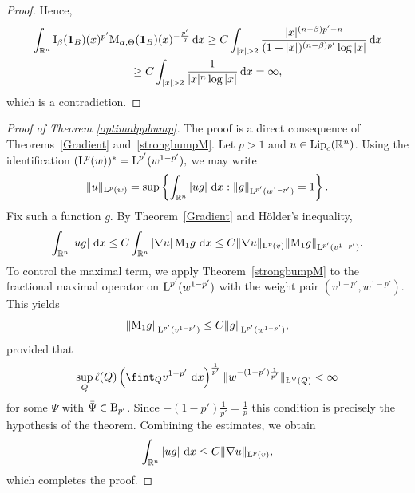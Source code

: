 \documentclass[11pt, a4paper, reqno]{amsart}
\newcommand{\R}{\mathbb R}
\newcommand{\dx}{\,{\mathrm dx}}
\newcommand{\Lup}{\textup{L}}
\newcommand{\Ldash}{\textup{\L}}
\DeclareMathOperator{\Lip}{\textup{Lip}}
\theoremstyle{definition}
\theoremstyle{remark}
\begin{document}
\begin{proof}
Hence,
\begin{multline*}
\int_{\mathbb{R}^n} \textup{I}_\beta(\mathbf{1}_B)(x)^{p'} \textup{M}_{\alpha,\Theta}(\mathbf{1}_B)(x)^{-\frac{p'}{q}} \dx
\ge C \int_{|x|>2} \frac{|x|^{(n-\beta)p' - n}}{(1+|x|)^{(n-\beta)p'} \log|x|} \dx \\
\ge C \int_{|x|>2} \frac{1}{|x|^n \log|x|} \dx = \infty,
\end{multline*}
which is a contradiction.
\end{proof}



\begin{proof}[Proof of Theorem \ref{optimalppbump}] The proof is a direct consequence of Theorems~\ref{Gradient} and~\ref{strongbumpM}. Let $p>1$ and $u\in \Lip_c(\R^n)$. Using the identification
$(\Lup^p(w))^* = \Lup^{p'}(w^{1-p'}),$ we may write
\[
\|u\|_{\Lup^p(w)}
= \sup\left\{ \int_{\R^n} |u g|\,\dx : \|g\|_{\Lup^{p'}(w^{1-p'})}=1 \right\}.
\]
Fix such a function $g$. By Theorem~\ref{Gradient} and H\"older's inequality,
\[
\int_{\R^n} |u g|\,\dx
\le C \int_{\R^n} |\nabla u|\, \textup{M}_1 g\,\dx
\le C \|\nabla u\|_{\Lup^{p}(v)} \|\textup{M}_1 g\|_{\Lup^{p'}(v^{1-p'})}.
\]
To control the maximal term, we apply Theorem~\ref{strongbumpM} to the fractional maximal operator on $\Lup^{p'}(w^{1-p'})$ with the weight pair $(v^{1-p'},w^{1-p'})$. This yields
\[
\|\textup{M}_1 g\|_{\Lup^{p'}(v^{1-p'})}
\le C \|g\|_{\Lup^{p'}(w^{1-p'})},
\]
provided that
\[
\sup_Q \ell(Q)\left(\fint_Q v^{1-p'}\,\dx\right)^{\frac1{p'}}
\|w^{-(1-p')\frac1{p'}}\|_{\Ldash^\Psi(Q)} < \infty
\]
for some $\Psi$ with $\bar{\Psi}\in \textup B_{p'}$. Since $-(1-p')\frac1{p'}=\frac1p$ this condition is precisely the hypothesis of the theorem. Combining the estimates, we obtain
\[
\int_{\R^n} |u g|\,\dx
\le C \|\nabla u\|_{\Lup^{p}(v)},
\]
which completes the proof.


\end{proof}
\end{document}
